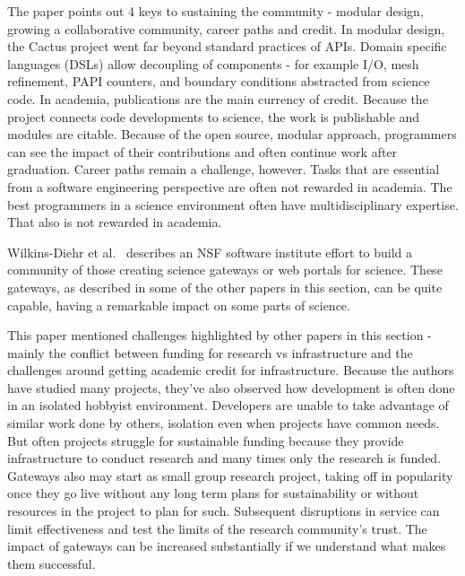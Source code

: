 \documentclass[11pt, oneside]{amsart}
\begin{document}
The paper points out 4 keys to sustaining the community - modular design,
growing a collaborative community, career paths and credit. In modular design,
the Cactus project went far beyond standard practices of APIs. Domain specific
languages (DSLs) allow decoupling of components - for example I/O, mesh
refinement, PAPI counters, and boundary conditions abstracted from science
code. In academia, publications are the main currency of credit. Because the
project connects code developments to science, the work is publishable and
modules are citable. Because of the open source, modular approach, programmers
can see the impact of their contributions and often continue work after
graduation. Career paths remain a challenge, however. Tasks that are essential
from a software engineering perspective are often not rewarded in academia. The
best programmers in a science environment often have multidisciplinary
expertise. That also is not rewarded in academia.

Wilkins-Diehr et al.~\cite{Wilkins-Diehr_WSSSPE} describes an NSF software institute effort to build a
community of those creating science gateways or web portals for science. These
gateways, as described in some of the other papers in this section, can be
quite capable, having a remarkable impact on some parts of science.

This paper mentioned challenges highlighted by other papers in this section -
mainly the conflict between funding for research vs infrastructure and the
challenges around getting academic credit for infrastructure. Because the
authors have studied many projects, they've also observed how development is
often done in an isolated hobbyist environment. Developers are unable to take
advantage of similar work done by others, isolation even when projects have
common needs. But often projects struggle for sustainable funding because they
provide infrastructure to conduct research and many times only the research is
funded. Gateways also may start as small group research project, taking off in
popularity once they go live without any long term plans for sustainability or
without resources in the project to plan for such. Subsequent disruptions in
service can limit effectiveness and test the limits of the research community's
trust. The impact of gateways can be increased substantially if we understand
what makes them successful.
\end{document}
